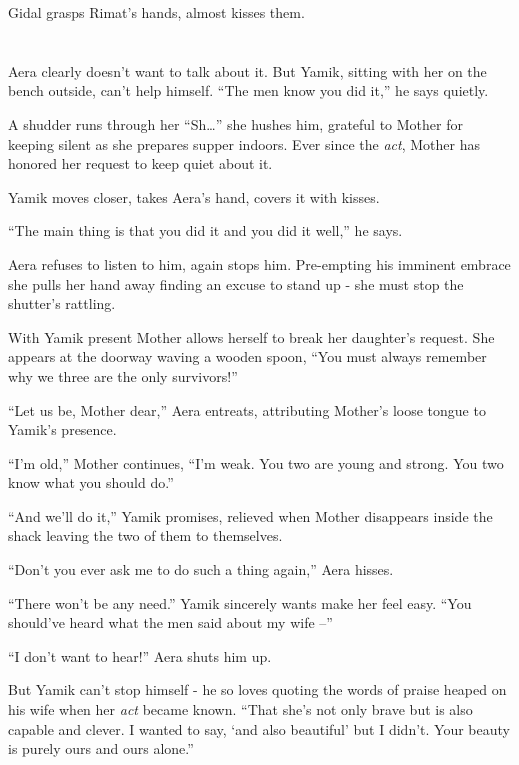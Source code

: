 \documentclass[twoside,11pt]{book}
\begin{document}
Gidal grasps Rimat's hands, almost kisses them.


\bigskip

\chapter{}

Aera clearly doesn't want to talk about it. But Yamik, sitting with her on the bench outside, can't help himself.
 ``The men know you did it,'' he says quietly.

A shudder runs through her ``Sh{\dots}'' she hushes him, grateful to Mother for keeping
silent as she prepares supper indoors.  Ever since the \textit{act}, Mother has honored her request to keep quiet about
it.

Yamik moves closer, takes Aera's hand, covers it with kisses.

``The main thing is that you did it and you did it well,'' he says.

Aera refuses to listen to him, again stops him. Pre-empting his imminent embrace she pulls her hand
away finding an excuse to stand up - she must stop the shutter's rattling.

With Yamik present Mother allows herself to break her daughter's request. She appears at the doorway waving a wooden
spoon, ``You must always remember why we three are the only survivors!''

``Let us be, Mother dear,'' Aera entreats, attributing Mother's loose tongue to Yamik's
presence.

``I'm old,'' Mother continues, ``I'm weak. You two are young and strong. You two
know what you should do.''

``And we'll do it,'' Yamik promises, relieved when Mother disappears inside the shack leaving
the two of them to themselves.

``Don't you ever ask me to do such a thing again,'' Aera hisses.

``There won't be any need.'' Yamik sincerely wants make her feel easy. ``You
should've heard what the men said about my wife --''

``I don't want to hear!'' Aera shuts him up.

But Yamik can't stop himself - he so loves quoting the words of praise heaped on his wife when her \textit{act} became
known. ``That she's not only brave but is also capable and clever. I wanted to say, `and also beautiful'
but I didn't. Your beauty is purely ours and ours alone.''
\end{document}
